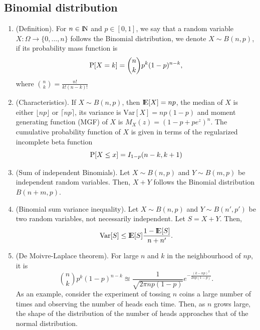 \documentclass[a4paper,10pt]{article}
\begin{document}
\subsection{Binomial distribution}
\begin{enumerate}
 \item (Definition). For \(n\in\N\) and \(p\in[0,1]\), we say that a random variable 
       \(X:\Omega\to\{0,\ldots, n\}\) follows the Binomial distribution, we denote 
       \(X \sim B(n,p)\), if its probability mass function is
       \[
        \mathrm{P}[X = k] = {n \choose k} p^k (1-p)^{n-k},
       \]
       where \({n \choose k} = \frac{n!}{k!(n-k)!}\)
 \item (Characteristics). If \(X \sim B(n,p)\), then \(\E[X]=np\), the median of \(X\) 
       is either \(\lfloor np \rfloor\) or \(\lceil np \rceil\), its variance is 
       \(\mathrm{Var}[X] = np(1-p)\) and moment generating function (MGF) of \(X\) is 
       \(M_X(z) = (1-p+pe^z)^n\). The cumulative probability function of \(X\) is given 
       in terms of the regularized incomplete beta function
       \[
        \mathrm{P}[X \leq x] = I_{1-p}(n-k, k+1)
       \]
 \item (Sum of independent Binomials). Let \(X\sim B(n,p)\) and \(Y\sim B(m,p)\) be 
       independent random variables. Then, \(X+Y\) follows the Binomial distribution
       \(B(n+m, p)\).
       
 \item (Binomial sum variance inequality). Let \(X\sim B(n,p)\) and \(Y\sim B(n',p')\) 
       be two random variables, not necessarily independent. Let \(S=X+Y\). Then,
       \[
        \mathrm{Var}[S] \leq \E[S]\frac{1-\E[S]}{n+n'}.
       \]
       
 \item (De Moivre-Laplace theorem). For large \(n\) and \(k\) in the neighbourhood of \(np\),
       it is 
       \[
        {n \choose k} p^k (1-p)^{n-k} \approxeq \frac{1}{\sqrt{2\pi n p (1-p)}}e^{-\frac{(k-np)^2}{2np(1-p)}}.
       \]
       As an example, consider the experiment of tossing \(n\) coins a large number of times 
       and observing the number of heads each time. Then, as \(n\) grows large, the shape of 
       the distribution of the number of heads approaches that of the normal distribution.
\end{enumerate}
\end{document}
